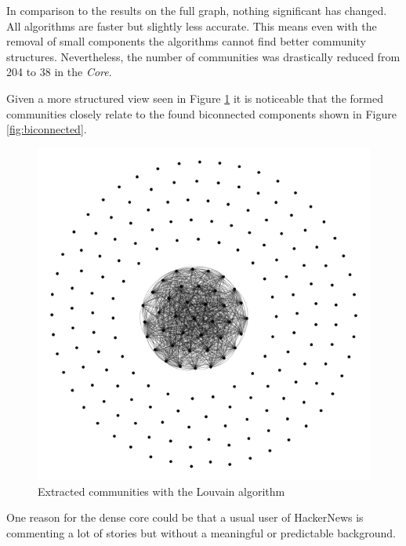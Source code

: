 \documentclass[sigconf]{acmart}
\begin{document}
In comparison to the results on the full graph, nothing significant has changed.
All algorithms are faster but slightly less accurate.
This means even with the removal of small components the algorithms cannot find better community structures.
Nevertheless, the number of communities was drastically reduced from 204 to 38 in the \textit{Core}.

Given a more structured view seen in Figure \ref{fig:comm_graph} it is noticeable that the formed communities closely relate to the found biconnected components shown in Figure \ref{fig:biconnected}. 

\begin{figure}[h]
    \includegraphics[width=\textwidth / 2]{images/comm_graph.png}
    \caption{Extracted communities with the Louvain algorithm}
    \label{fig:comm_graph}
\end{figure}

One reason for the dense core could be that a usual user of HackerNews is commenting a lot of stories but without a meaningful or predictable background.

\end{document}
